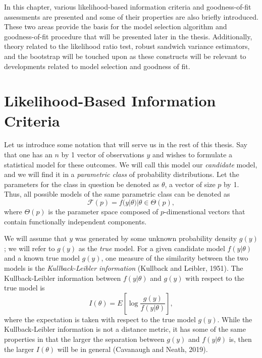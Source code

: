 \doublespace
{}
		In this chapter, various likelihood-based information criteria and goodness-of-fit assessments are presented and some of their properties are also briefly introduced.
		These two areas provide the basis for the model selection algorithm and goodness-of-fit procedure that will be presented later in the thesis. Additionally, theory
		related to the likelihood ratio test, robust sandwich variance estimators, and the bootstrap will be touched upon as these constructs will be relevant to developments
		related to model selection and goodness of fit.
		
		\section{Likelihood-Based Information Criteria}

		Let us introduce some notation that will serve us in the rest of this thesis. Say that one has an $n$ by 1  vector of observations $y$ and wishes to formulate a
		statistical model for these outcomes. We will call this model our \textit{candidate} model, and we will find it in a \textit{parametric class} of probability distributions.
		Let the parameters for the class in question be denoted as $\theta$, a vector of size $p$ by 1. Thus, all possible models of the same parametric class can be denoted
		as
		\begin{equation}
			\mathcal{F}(p) = {f(y|\theta) | \theta \in \Theta(p)},
		\end{equation}
		where $\Theta(p)$ is the parameter space composed of $p$-dimenstional vectors that contain functionally independent components.

		We will assume that $y$ was generated by some unknown probability density $g(y)$; we will refer to $g(y)$ as the \textit{true} model. For a given candidate model $f(y|\theta)$
		and a known true model $g(y)$, one measure of the similarity between the two models is the \textit{Kullback-Leibler information} (Kullback and Leibler, 1951). The Kullback-Leibler
		information between $f(y|\theta)$ and $g(y)$ with respect to the true model is
		\begin{equation}
			I(\theta) = E \left[ \log \frac{g(y)}{f(y|\theta)} \right],
		\end{equation}
		where the expectation is taken with respect to the true model $g(y)$. While the Kullback-Leibler information is not a distance metric, it has some of the same properties in
		that the larger the separation between $g(y)$ and $f(y|\theta)$ is, then the larger $I(\theta)$ will be in general (Cavanaugh and Neath, 2019).
		
